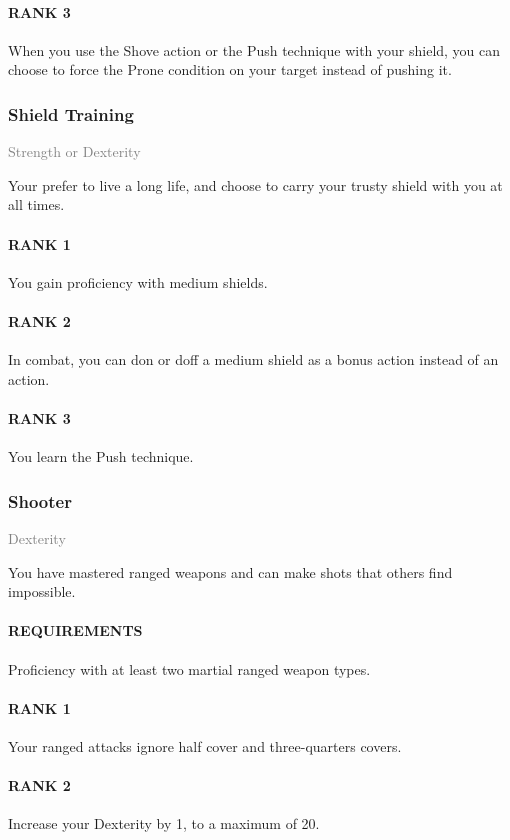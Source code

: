 \paragraph{RANK 3} When you use the Shove action or the Push technique with your shield, you can choose to force the Prone condition on your target instead of pushing it.

\subsubsection{Shield Training} \label{feat::shieldtraining}
\small{\textcolor{gray}{Strength or Dexterity}}

\normalsize
Your prefer to live a long life, and choose to carry your trusty shield with you at all times.
\paragraph{RANK 1} You gain proficiency with medium shields.
\paragraph{RANK 2} In combat, you can don or doff a medium shield as a bonus action instead of an action.
\paragraph{RANK 3} You learn the Push technique.

\subsubsection{Shooter} \label{feat::shooter}
\small{\textcolor{gray}{Dexterity}}

\normalsize
You have mastered ranged weapons and can make shots that others find impossible.
\paragraph{REQUIREMENTS} Proficiency with at least two martial ranged weapon types.
\paragraph{RANK 1} Your ranged attacks ignore half cover and three-quarters covers.
\paragraph{RANK 2} Increase your Dexterity by 1, to a maximum of 20.
